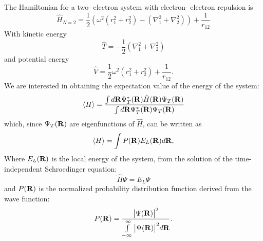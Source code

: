 \documentclass[10pt,a4paper]{article}
\begin{document}
The Hamiltonian for a two- electron system with electron- electron repulsion is
\begin{equation}
\hat{H}_{N=2} = \frac{1}{2}\left( \omega^2   \left( r_1^2+r_2^2 \right)-\left( \nabla_1^2 + \nabla_2^2 \right)  \right)+\frac{1}{r_{12}}
\end{equation}
With kinetic energy 
\begin{equation}
\hat{T} = - \frac{1}{2}\left( \nabla_1^2 + \nabla_2^2 \right) 
\end{equation}
and potential energy 
\begin{equation}
\hat{V}=  \frac{1}{2} \omega^2   \left( r_1^2+r_2^2 \right) +\frac{1}{r_{12}}.
\end{equation}
We are interested in obtaining the expectation value of the energy of the system:
\begin{equation}
\langle H \rangle = \frac{\int d{\bf
R}\Psi^{\ast}_T({\bf R})\hat{H}({\bf R})\Psi_T({\bf R})}
{\int d{\bf
R}\Psi^{\ast}_T({\bf R})\Psi_T({\bf R})}
\end{equation}
which, since $\Psi_T({\bf R})$ are eigenfunctions of $\hat{H}$, can be written as 
\begin{equation}\label{Energy_expectation_value}
\langle H \rangle =\int P({\bf R})E_L({\bf R})d{\bf R},
\end{equation}
Where $E_L({\bf R})$ is the local energy of the system, from the solution of the time- independent Schroedinger equation:
\begin{equation}
\hat{H}\Psi = E_L\Psi
\end{equation}
and $P({\bf R})$ is the normalized probability distribution function derived from the wave function:
\begin{equation}
P({\bf R})=\frac{\big| \Psi({\bf R}) \big|^2}{\int\limits_{-\infty}^\infty\big| \Psi({\bf R}) \big|^2 d{\bf R}}.
\end{equation}
\end{document}
